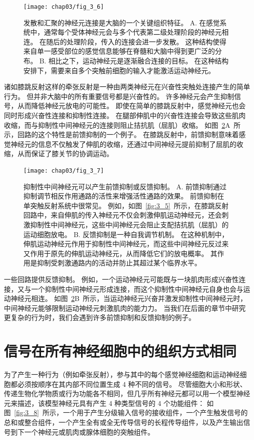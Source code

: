 \begin{figure}[htbp]
	\centering
	\texttt{[image: chap03/fig\_3\_6]}
	\caption{发散和汇聚的神经元连接是大脑的一个关键组织特征。
		A. 在感觉系统中，通常每个受体神经元会与多个代表第二级处理阶段的神经元相连。 
		在随后的处理阶段，传入的连接会进一步发散。 
		这种结构使得来自单一感受部位的感觉信息能够在脊髓和大脑中得到更广泛的分布。
		B. 相比之下，运动神经元是逐渐融合连接的目标。 
		在这种结构安排下，需要来自多个突触前细胞的输入才能激活运动神经元。}
	\label{fig:3_6}
\end{figure}


诸如膝跳反射这样的牵张反射是一种由两类神经元在兴奋性突触处连接产生的简单行为。
但并非大脑中的所有重要信号都是兴奋性的。 
许多神经元会产生抑制信号，从而降低神经元放电的可能性。 
即使在简单的膝跳反射中，感觉神经元也会同时形成兴奋性连接和抑制性连接。
在腿部伸肌中的兴奋性连接会导致这些肌肉收缩，而与抑制性中间神经元的连接则阻止拮抗肌（屈肌）收缩。 
如图~\ref{fig:3_7}A~所示，回路的这个特性是前馈抑制的一个例子。 
在膝跳反射中，前馈抑制意味着感觉神经元的信息不仅触发了伸肌的收缩，还通过中间神经元提前抑制了屈肌的收缩，从而保证了膝关节的协调运动。


\begin{figure}[htbp]
	\centering
	\texttt{[image: chap03/fig\_3\_7]}
	\caption{抑制性中间神经元可以产生前馈抑制或反馈抑制。
		A. 前馈抑制通过抑制调节相反作用通路的活性来增强活性通路的效果。
		前馈抑制在单突触反射系统中很常见。 
		例如，如图~\ref{fig:3_5}~所示，在膝跳反射回路中，来自伸肌的传入神经元不仅会刺激伸肌运动神经元，还会刺激抑制性中间神经元，这些中间神经元会阻止支配拮抗肌（屈肌）的运动细胞放电。
		B. 反馈抑制是一种自我调节机制。
		在这种机制中，伸肌运动神经元作用于抑制性中间神经元，而这些中间神经元反过来又作用于原先的伸肌运动神经元，从而降低它们的放电概率。
		其作用是抑制受刺激通路内的活动并防止其超过某个临界水平。}
	\label{fig:3_7}
\end{figure}


一些回路提供反馈抑制。 
例如，一个运动神经元可能既与一块肌肉形成兴奋性连接，又与一个抑制性中间神经元形成连接，而这个抑制性中间神经元自身也会与运动神经元相连。
如图~\ref{fig:3_7}B~所示，当运动神经元兴奋并激发抑制性中间神经元时，中间神经元能够限制运动神经元刺激肌肉的能力力。
当我们在后面的章节中研究更复杂的行为时，我们会遇到许多前馈抑制和反馈抑制的例子。


\section{信号在所有神经细胞中的组织方式相同}
为了产生一种行为（例如牵张反射），参与其中的每个感觉神经细胞和运动神经细胞都必须按顺序在其内部不同位置生成 4 种不同的信号。
尽管细胞大小和形状、传递生物化学物质或行为功能各不相同，但几乎所有神经元都可以用一个模型神经元来描述，该模型神经元具有产生 4 种类型信号的 4 个功能组件：
如图~\ref{fig:3_8}~所示，一个用于产生分级输入信号的接收组件，一个产生触发信号的总和或整合组件，一个产生全有或全无传导信号的长程传导组件，以及产生输出信号到下一个神经元或肌肉或腺体细胞的突触组件。


